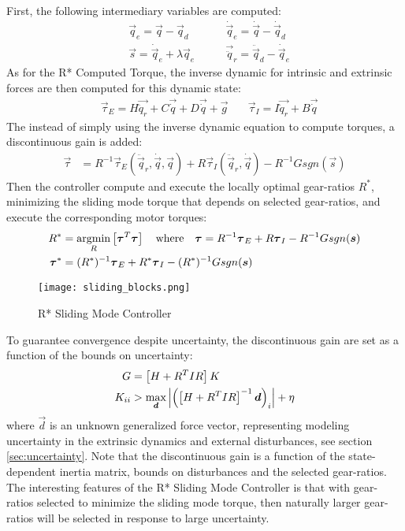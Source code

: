 First, the following intermediary variables are computed:
%
\begin{align}
	&\vec{q}_e        = \vec{q}          -  \vec{q}_d   \quad\quad
	&\dot{\vec{q}}_e  = \dot{\vec{q}}    -  \dot{\vec{q}}_d \\
	&\vec{s}          = \dot{\vec{q}}_e  +  \lambda \vec{q}_e \quad\quad
  &\vec{\ddot{q}}_r = \ddot{\vec{q}}_d -  \dot{\vec{q}}_e 
 \label{eq:slidingvar}
\end{align}
%
As for the R* Computed Torque, the inverse dynamic for intrinsic and extrinsic forces are then computed for this dynamic state:
%
\begin{align}
	&\vec{\tau}_{E} = H \vec{ \ddot{q}_r } + C\vec{ \dot{q} } + D \vec{ \dot{q} } + \vec{ g } \quad
	&\vec{\tau}_{I} = I \vec{ \ddot{q}_r } + B \vec{ \dot{q} } 
\end{align}
%
The instead of simply using the inverse dynamic equation to compute torques, a discontinuous gain is added:
%
\begin{align}
	\vec{\tau} &=  R^{-1} 
	\vec{\tau}_{E}(\ddot{\vec{q}}_r,\dot{\vec{q}},\vec{q}) 
	+ R 
	\vec{\tau}_{I}(\ddot{\vec{q}}_r,\dot{\vec{q}})
  - R^{-1} G sgn( \vec{s} ) 
 \label{eq:slidingctl}
\end{align}
%
Then the controller compute and execute the locally optimal gear-ratios $R^*$, minimizing the sliding mode torque that depends on selected gear-ratios, and execute the corresponding motor torques: 
%
\begin{align}
R^{*} &= \operatornamewithlimits{argmin}\limits_{R} \left[ \vec{\tau}^T\vec{\tau}  \right] \quad\text{where}\quad \vec{\tau} = R^{-1} \vec{\tau}_{E} + R \vec{\tau}_{I} - R^{-1} G sgn( \vec{s} ) 
\\
\vec{\tau}^* &= (R^*)^{-1} \vec{\tau}_{E} + R^* \vec{\tau}_{I} - (R^*)^{-1} G sgn( \vec{s} ) 
\end{align} 
%
\begin{figure}[t]
	\centering
		\texttt{[image: sliding\_blocks.png]}
	\caption{R* Sliding Mode Controller}
	\label{fig:sliding_blocks}
\end{figure}
%
To guarantee convergence despite uncertainty, the discontinuous gain are set as a function of the bounds on uncertainty:
%
\begin{align}
	G &= \left[ H + R^T I R \right] K \\ K_{ii} &> \operatornamewithlimits{max}\limits_{\vec{d}} \left| \left(  \left[ H + R^T I R \right]^{-1} \vec{d} \right)_{i} \right| + \eta
\end{align}
%
where $\vec{d}$ is an unknown generalized force vector, representing modeling uncertainty in the extrinsic dynamics and external disturbances, see section \ref{sec:uncertainty}. Note that the discontinuous gain is a function of the state-dependent inertia matrix, bounds on disturbances and the selected gear-ratios. The interesting features of the R* Sliding Mode Controller is that with gear-ratios selected to minimize the sliding mode torque, then naturally larger gear-ratios  will be selected in response to large uncertainty. 

